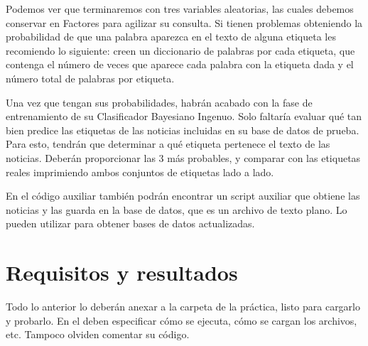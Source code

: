 Podemos ver que terminaremos con tres variables aleatorias, las cuales debemos conservar en Factores para agilizar su consulta. Si tienen problemas obteniendo la probabilidad de que una palabra aparezca en el texto de alguna etiqueta les recomiendo lo siguiente: creen un diccionario de palabras por cada etiqueta, que contenga el número de veces que aparece cada palabra con la etiqueta dada y el número total de palabras por etiqueta.

Una vez que tengan sus probabilidades, habrán acabado con la fase de entrenamiento de su Clasificador Bayesiano Ingenuo. Solo faltaría evaluar qué tan bien predice las etiquetas de las noticias incluidas en su base de datos de prueba. Para esto, tendrán que determinar a qué etiqueta pertenece el texto de las noticias. Deberán proporcionar las 3 más probables, y comparar con las etiquetas reales imprimiendo ambos conjuntos de etiquetas lado a lado.

En el código auxiliar también podrán encontrar un script auxiliar que obtiene las noticias y las guarda en la base de datos, que es un archivo de texto plano. Lo pueden utilizar para obtener bases de datos actualizadas.

\section{Requisitos y resultados}

Todo lo anterior lo deberán anexar a la carpeta de la práctica, listo para cargarlo y probarlo. En el  deben especificar cómo se ejecuta, cómo se cargan los archivos, etc. Tampoco olviden comentar su código.
